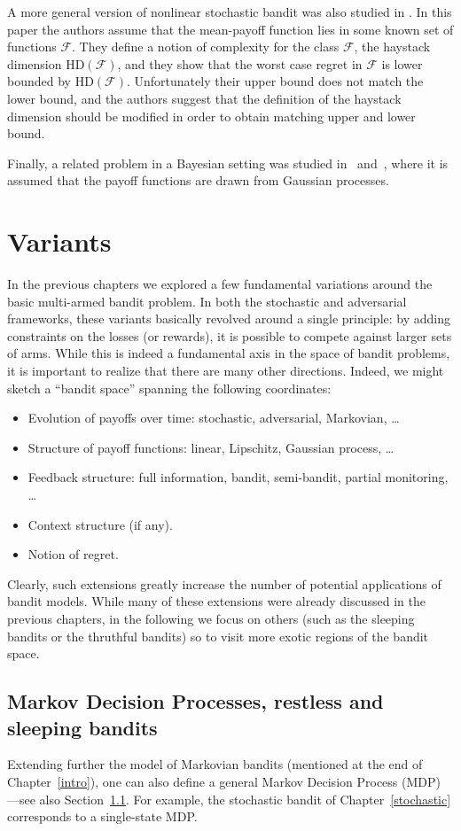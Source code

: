 \documentclass[11pt]{hackednow}
\newcommand{\cF}{\mathcal{F}}
\begin{document}
A more general version of nonlinear stochastic bandit was also studied in \cite{AKS11}. In this paper the authors assume that the mean-payoff function lies in some known set of functions $\cF$. They define a notion of complexity for the class $\cF$, the haystack dimension $\mathrm{HD}(\cF)$, and they show that the worst case regret in $\cF$ is lower bounded by $\mathrm{HD}(\cF)$. Unfortunately their upper bound does not match the lower bound, and the authors suggest that the definition of the haystack dimension should be modified in order to obtain matching upper and lower bound.

Finally, a related problem in a Bayesian setting was studied in~\cite{SKKS10} and~\cite{GAOS10}, where it is assumed that the payoff functions are drawn from Gaussian processes.

 
\chapter{Variants}
\label{variants}
In the previous chapters we explored a few fundamental variations around the basic multi-armed bandit problem. In both the stochastic and adversarial frameworks, these variants basically revolved around a single principle: by adding constraints on the losses (or rewards), it is possible to compete against larger sets of arms. While this is indeed a fundamental axis in the space of bandit problems, it is important to realize that there are many other directions. Indeed, we might sketch a ``bandit space'' spanning the following coordinates:
\begin{itemize}
\item Evolution of payoffs over time: stochastic, adversarial, Markovian, \dots
\item Structure of payoff functions: linear, Lipschitz, Gaussian process, \dots
\item Feedback structure: full information, bandit, semi-bandit, partial monitoring, \dots
\item Context structure (if any).
\item Notion of regret.
\end{itemize}
Clearly, such extensions greatly increase the number of potential applications of bandit models. While many of these extensions were already discussed in the previous chapters, in the following we focus on others (such as the sleeping bandits or the thruthful bandits) so to visit more exotic regions of the bandit space.

\section{Markov Decision Processes, restless and sleeping bandits}
\label{s:mdp}
Extending further the model of Markovian bandits (mentioned at the end of Chapter~\ref{intro}), one can also define a general Markov Decision Process (MDP) ---see also Section~\ref{s:mdp}. For example, the stochastic bandit of Chapter~\ref{stochastic} corresponds to a single-state MDP.
\end{document}
